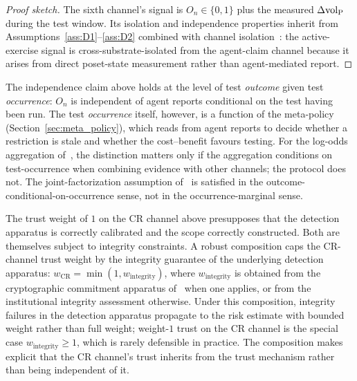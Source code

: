\begin{proof}[Proof sketch]
The sixth channel's signal is
$O_n \in \{0, 1\}$ plus the measured
$\Delta {\operatorname{vol}_{\mathrm{P}}}$ during the test window.  Its isolation and
independence properties inherit from
Assumptions~\ref{ass:D1}--\ref{ass:D2} combined with channel
isolation~\citep[Proposition~5]{lasser2026exo}: the active-exercise
signal is cross-substrate-isolated from the
agent-claim channel because it arises from direct poset-state
measurement rather than agent-mediated report.
\end{proof}

\begin{remark}
\label{rem:outcome_vs_occurrence}
The independence claim above holds at the level of test
\emph{outcome} given test \emph{occurrence}: $O_n$ is
independent of agent reports conditional on the test having
been run.  The test \emph{occurrence} itself, however, is a
function of the meta-policy (Section~\ref{sec:meta_policy}),
which reads from agent reports to decide whether a restriction
is stale and whether the cost--benefit favours testing.  For
the log-odds aggregation
of~\citep[Definition~5]{lasser2026scm}, the distinction matters
only if the aggregation conditions on test-occurrence when
combining evidence with other channels; the protocol does not.
The joint-factorization assumption
of~\citep{lasser2026exo} is satisfied in the
outcome-conditional-on-occurrence sense, not in the
occurrence-marginal sense.
\end{remark}

\begin{remark}
\label{rem:trust_weight_composition}
The trust weight of $1$ on the CR channel above presupposes
that the detection apparatus is correctly calibrated and the
scope correctly constructed.  Both are themselves subject to
integrity constraints.  A robust composition caps the
CR-channel trust weight by the integrity guarantee of the
underlying detection apparatus:
$w_{\mathrm{CR}} = \min(1, w_{\mathrm{integrity}})$, where
$w_{\mathrm{integrity}}$ is obtained from the cryptographic
commitment apparatus of~\citep{lasser2026exo} when one applies,
or from the institutional integrity assessment otherwise.  Under
this composition, integrity failures in the detection apparatus
propagate to the risk estimate with bounded weight rather than
full weight; weight-$1$ trust on the CR channel is the special
case $w_{\mathrm{integrity}} \geq 1$, which is rarely defensible
in practice.  The composition makes explicit that the CR
channel's trust inherits from the trust mechanism rather than
being independent of it.
\end{remark}

